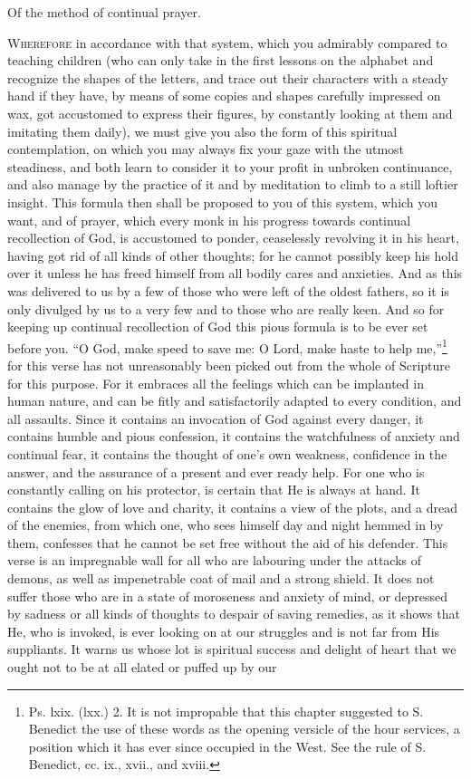 
Of the method of continual prayer.

\textsc{Wherefore} in accordance with that system, which you admirably compared to teaching children (who can only take in the first lessons on the alphabet and recognize the shapes of the letters, and trace out their characters with a steady hand if they have, by means of some copies and shapes carefully impressed on wax, got accustomed to express their figures, by constantly looking at them and imitating them daily), we must give you also the form of this spiritual contemplation, on which you may always fix your gaze with the utmost steadiness, and both learn to consider it to your profit in unbroken continuance, and also manage by the practice of it and by meditation to climb to a still loftier insight. This formula then shall be proposed to you of this system, which you want, and of prayer, which every monk in his progress towards continual recollection of God, is accustomed to ponder, ceaselessly revolving it in his heart, having got rid of all kinds of other thoughts; for he cannot possibly keep his hold over it unless he has freed himself from all bodily cares and anxieties. And as this was delivered to us by a few of those who were left of the oldest fathers, so it is only divulged by us to a very few and to those who are really keen. And so for keeping up continual recollection of God this pious formula is to be ever set before you. “O God, make speed to save me: O Lord, make haste to help me,”\footnote{Ps. lxix. (lxx.) 2. It is not impropable that this chapter suggested to S. Benedict the use of these words as the opening versicle of the hour services, a position which it has ever since occupied in the West. See the rule of S. Benedict, cc. ix., xvii., and xviii.} for this verse has not unreasonably been picked out from the whole of Scripture for this purpose. For it embraces all the feelings which can be implanted in human nature, and can be fitly and satisfactorily adapted to every condition, and all assaults. Since it contains an invocation of God against every danger, it contains humble and pious confession, it contains the watchfulness of anxiety and continual fear, it contains the thought of one’s own weakness, confidence in the answer, and the assurance of a present and ever ready help. For one who is constantly calling on his protector, is certain that He is always at hand. It contains the glow of love and charity, it contains a view of the plots, and a dread of the enemies, from which one, who sees himself day and night hemmed in by them, confesses that he cannot be set free without the aid of his defender. This verse is an impregnable wall for all who are labouring under the attacks of demons, as well as impenetrable coat of mail and a strong shield. It does not suffer those who are in a state of moroseness and anxiety of mind, or depressed by sadness or all kinds of thoughts to despair of saving remedies, as it shows that He, who is invoked, is ever looking on at our struggles and is not far from His suppliants. It warns us whose lot is spiritual success and delight of heart that we ought not to be at all elated or puffed up by our 
